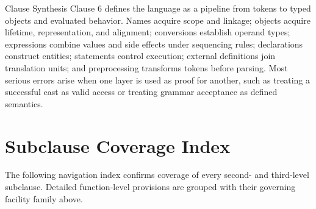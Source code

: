 \documentclass[10pt,letterpaper]{article}
\begin{document}
\begin{CornellSummaryBox}{Clause Synthesis}
Clause 6 defines the language as a pipeline from tokens to typed objects and evaluated behavior. Names acquire scope and linkage; objects acquire lifetime, representation, and alignment; conversions establish operand types; expressions combine values and side effects under sequencing rules; declarations construct entities; statements control execution; external definitions join translation units; and preprocessing transforms tokens before parsing. Most serious errors arise when one layer is used as proof for another, such as treating a successful cast as valid access or treating grammar acceptance as defined semantics.
\end{CornellSummaryBox}


\section{Subclause Coverage Index}
The following navigation index confirms coverage of every second- and third-level subclause. Detailed function-level provisions are grouped with their governing facility family above.
\end{document}
